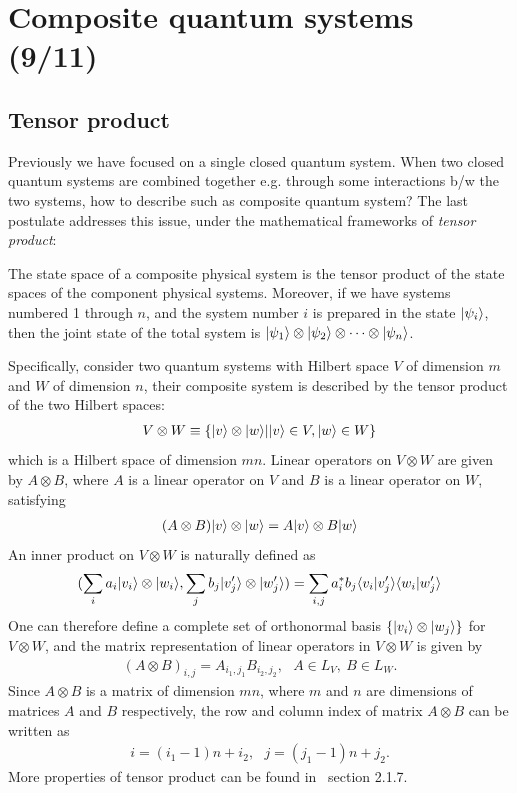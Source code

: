 \section{Composite quantum systems (9/11)}
\label{sec:composite system}


\subsection{Tensor product}

Previously we have focused on a single closed quantum system. When two closed quantum systems are combined together e.g. through some interactions b/w the two systems, how to describe such as composite quantum system? The last postulate addresses this issue, under the mathematical frameworks of \emph{tensor product}:
\begin{pos}\label{postulate 4}
    The state space of a composite physical system is the tensor product of the state spaces of the component physical systems. Moreover, if we have systems numbered 1 through $n$, and the system number $i$ is prepared in the state $|{\psi_i}\rangle$, then the joint state of the total system is $|{\psi_1}\rangle\otimes|{\psi_2}\rangle\otimes\cdots\otimes|{\psi_n}\rangle$.
\end{pos}

Specifically, consider two quantum systems with Hilbert space $V$ of dimension $m$ and $W$ of dimension $n$, their composite system is described by the tensor product of the two Hilbert spaces:
\begin{align}
V\otimes W\equiv\{|{v}\rangle\otimes|{w}\rangle||{v}\rangle\in V, |{w}\rangle\in W\}
\end{align}
which is a Hilbert space of dimension $mn$. Linear operators on $V\otimes W$ are given by $A\otimes B$, where $A$ is a linear operator on $V$ and $B$ is a linear operator on $W$, satisfying
\begin{align}
(A\otimes B)|{v}\rangle\otimes|{w}\rangle=A|{v}\rangle\otimes B|{w}\rangle
\end{align}
An inner product on $V\otimes W$ is naturally defined as
\begin{align}
(\sum_ia_i|{v_i}\rangle\otimes|{w_i}\rangle,\sum_jb_j|{v_j^\prime}\rangle\otimes|{w_j^\prime}\rangle)=\sum_{i,j}a^\ast_ib_j\langle{v_i|v_j^\prime}\rangle\langle{w_i|w_j^\prime}\rangle
\end{align}
One can therefore define a complete set of orthonormal basis $\{|{v_i}\rangle\otimes|{w_j}\rangle\}$ for $V\otimes W$, and the matrix representation of linear operators in $V\otimes W$ is given by
\begin{align}
(A\otimes B)_{i,j}=A_{i_1,j_1}B_{i_2,j_2},~~~A\in L_V,~B\in L_W.
\end{align}
Since $A\otimes B$ is a matrix of dimension $mn$, where $m$ and $n$ are dimensions of matrices $A$ and $B$ respectively, the row and column index of matrix $A\otimes B$ can be written as
\begin{align}
i=(i_1-1)n+i_2,~~~j=(j_1-1)n+j_2.
\end{align}
More properties of tensor product can be found in \nielsen~section 2.1.7.

